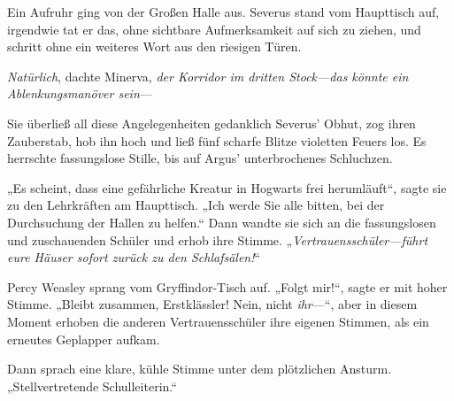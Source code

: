 Ein Aufruhr ging von der Großen Halle aus. Severus stand vom Haupttisch auf, irgendwie tat er das, ohne sichtbare Aufmerksamkeit auf sich zu ziehen, und schritt ohne ein weiteres Wort aus den riesigen Türen.

\emph{Natürlich}, dachte Minerva, \emph{der Korridor im dritten Stock—das könnte ein Ablenkungsmanöver sein}—


Sie überließ all diese Angelegenheiten gedanklich Severus’ Obhut, zog ihren Zauberstab, hob ihn hoch und ließ fünf scharfe Blitze violetten Feuers los.
Es herrschte fassungslose Stille, bis auf Argus’ unterbrochenes Schluchzen.

„Es scheint, dass eine gefährliche Kreatur in Hogwarts frei herumläuft“, sagte sie zu den Lehrkräften am Haupttisch.
„Ich werde Sie alle bitten, bei der Durchsuchung der Hallen zu helfen.“ Dann wandte sie sich an die fassungslosen und zuschauenden Schüler und erhob ihre Stimme. „\emph{Vertrauensschüler—führt eure Häuser sofort zurück zu den Schlafsälen!}“

Percy Weasley sprang vom Gryffindor-Tisch auf.
„Folgt mir!“, sagte er mit hoher Stimme.
„Bleibt zusammen, Erstklässler! Nein, nicht \emph{ihr}—“, aber in diesem Moment erhoben die anderen Vertrauensschüler ihre eigenen Stimmen, als ein erneutes Geplapper aufkam.


Dann sprach eine klare, kühle Stimme unter dem plötzlichen Ansturm.
„Stellvertretende Schulleiterin.“

